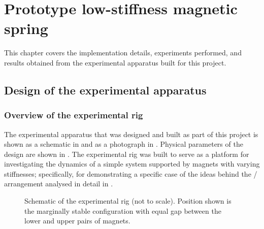 
\chapter{Prototype low-stiffness magnetic spring}


This chapter covers the implementation details, experiments performed,
and results obtained from the experimental apparatus built for this
project.

\section{Design of the experimental apparatus}

\subsection{Overview of the experimental rig}

The experimental apparatus that was designed and built as part of this project
is shown as a schematic in  and as a photograph in
. Physical parameters of the design are shown in
. The experimental rig was built to serve as a platform for
investigating the dynamics of a simple system supported by magnets with
varying stiffnesses; specifically, for demonstrating a specific case of
the ideas behind the \qzs/ arrangement analysed in detail in .

\begin{figure}
  \begin{wide}
  \end{wide}
  \caption{%
    Schematic of the experimental rig (not to scale). Position shown is
    the marginally stable configuration with equal gap between the lower
    and upper pairs of magnets.}
\end{figure}

